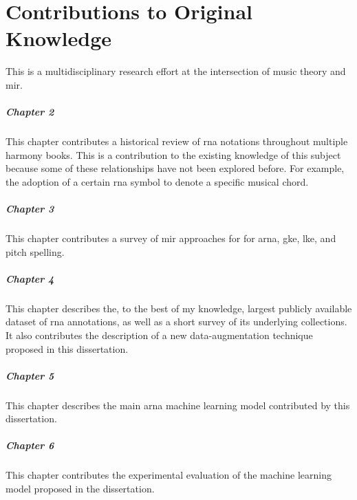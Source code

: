 \chapter*{Contributions to Original Knowledge}
\label{chap:contributionstoknowledge}

This \thesisdiss{} is a multidisciplinary research effort at
the intersection of music theory and \gls{mir}.

\paragraph{Chapter 2}

This chapter contributes a historical review of \gls{rna}
notations throughout multiple harmony books. This is a
contribution to the existing knowledge of this subject
because some of these relationships have not been explored
before. For example, the adoption of a certain \gls{rna}
symbol to denote a specific musical chord.

\paragraph{Chapter 3}

This chapter contributes a survey of \gls{mir} approaches
for for \gls{arna}, \gls{gke}, \gls{lke}, and pitch
spelling. 

\paragraph{Chapter 4}

This chapter describes the, to the best of my knowledge,
largest publicly available dataset of \gls{rna} annotations,
as well as a short survey of its underlying collections. It
also contributes the description of a new data-augmentation
technique proposed in this dissertation.

\paragraph{Chapter 5}

This chapter describes the main \gls{arna} machine learning
model contributed by this dissertation.

\paragraph{Chapter 6}

This chapter contributes the experimental evaluation of the
machine learning model proposed in the dissertation. 
